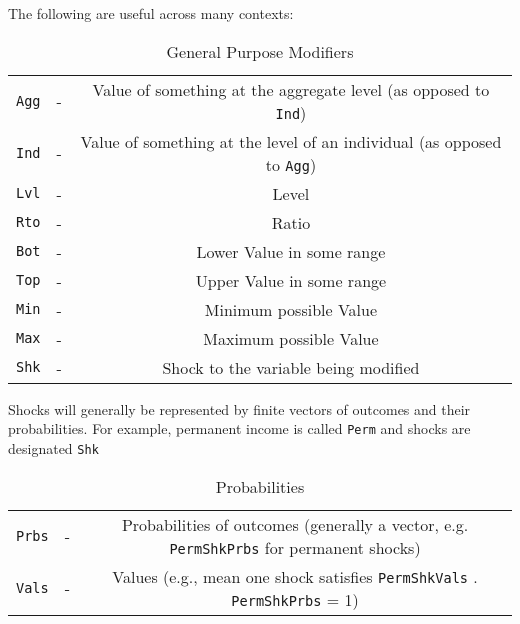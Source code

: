 
The following are useful across many contexts:
\begin{table}[h]
	\centering
	\begin{tabular}{||>{\ttfamily}ccc||}
		\hline
   \texttt{Agg} & - & Value of something at the aggregate level (as opposed to \texttt{Ind})
\\ \texttt{Ind} & - & Value of something at the level of an individual (as opposed to \texttt{Agg})
\\ \texttt{Lvl} & - & Level
\\ \texttt{Rto} & - & Ratio
\\ \texttt{Bot} & - & Lower Value in some range
\\ \texttt{Top} & - & Upper Value in some range
\\ \texttt{Min} & - & Minimum possible Value
\\ \texttt{Max} & - & Maximum possible Value
\\ \texttt{Shk} & - & Shock to the variable being modified
\\ 	\hline
	\end{tabular}
	\caption{General Purpose Modifiers}
	\label{table:General}
\end{table}

Shocks will generally be represented by finite vectors of outcomes and their probabilities.  For example, permanent income is called \texttt{Perm} and shocks are designated \texttt{Shk}
\begin{table}[h]
	\centering
	\begin{tabular}{||>{\ttfamily}ccc||}
		\hline
\texttt{Prbs} & - & Probabilities of outcomes (generally a vector, e.g. \texttt{PermShkPrbs} for permanent shocks)
\\ \texttt{Vals} & - & Values (e.g., mean one shock satisfies \texttt{PermShkVals} . \texttt{PermShkPrbs} = 1)
\\ 	\hline
	\end{tabular}
	\caption{Probabilities}
	\label{table:Probabilities}
\end{table}




